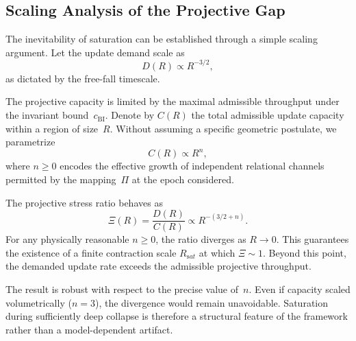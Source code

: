 \subsection{Scaling Analysis of the Projective Gap}
  \label{subsec:scaling_projective_gap}

  The inevitability of saturation can be established through a simple
  scaling argument.
  Let the update demand scale as
  \begin{equation}
    D(R) \propto R^{-3/2},
  \end{equation}
  as dictated by the free-fall timescale.

  The projective capacity is limited by the maximal admissible throughput
  under the invariant bound~$c_{\mathrm{BI}}$.
  Denote by $C(R)$ the total admissible update capacity within a region
  of size~$R$.
  Without assuming a specific geometric postulate, we parametrize
  \begin{equation}
    C(R) \propto R^{n},
  \end{equation}
  where $n \ge 0$ encodes the effective growth of independent relational
  channels permitted by the mapping~$\Pi$ at the epoch considered.

  The projective stress ratio behaves as
  \begin{equation}
    \Xi(R) = \frac{D(R)}{C(R)} \propto R^{-(3/2+n)}.
  \end{equation}
  For any physically reasonable $n \ge 0$, the ratio diverges as
  $R \rightarrow 0$.
  This guarantees the existence of a finite contraction scale
  $R_{\mathrm sat}$ at which $\Xi \sim 1$.
  Beyond this point, the demanded update rate exceeds the admissible
  projective throughput.

  The result is robust with respect to the precise value of~$n$.
  Even if capacity scaled volumetrically ($n=3$), the divergence would
  remain unavoidable.
  Saturation during sufficiently deep collapse is therefore a structural
  feature of the framework rather than a model-dependent artifact.
